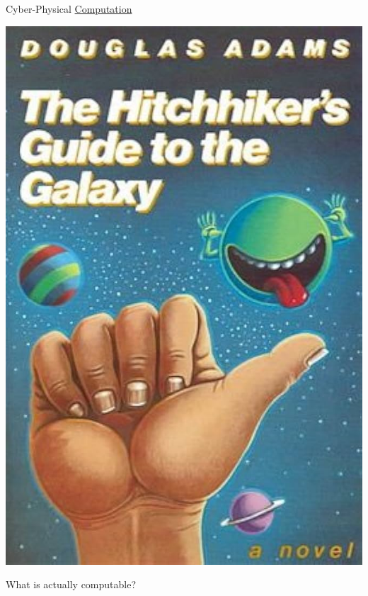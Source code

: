 \documentclass{beamer}
\begin{document}
\begin{frame}{Cyber-Physical \underline{Computation}}

\centering
\includegraphics[scale=0.15]{Images/hitchhiker.jpg} 

What is actually \alert{computable}?
\end{frame}
\end{document}
